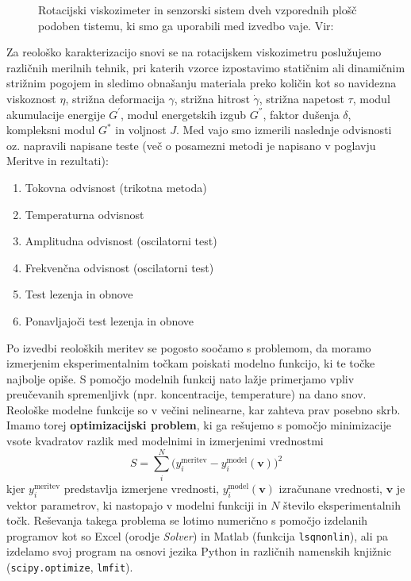 \documentclass{article}
\begin{document}
\begin{figure}
   \caption{Rotacijski viskozimeter in senzorski sistem dveh vzporednih plošč podoben tistemu, ki smo ga uporabili med izvedbo vaje. Vir: }
   \label{fig:viskozimeter}
\end{figure}

Za reološko karakterizacijo snovi se na rotacijskem viskozimetru poslužujemo različnih merilnih tehnik, pri katerih vzorce izpostavimo statičnim ali dinamičnim strižnim pogojem in sledimo obnašanju materiala preko količin kot so navidezna viskoznost $\eta$, strižna deformacija $\gamma$, strižna hitrost $\dot{\gamma}$, strižna napetost $\tau$, modul akumulacije energije $G^{'}$, modul energetskih izgub $G^{''}$, faktor dušenja $\delta$, kompleksni modul $G^*$ in voljnost $J$. Med vajo smo izmerili naslednje odvisnosti oz. napravili napisane teste (več o posamezni metodi je napisano v poglavju Meritve in rezultati):
\begin{enumerate}
\item Tokovna odvisnost (trikotna metoda)
\item Temperaturna odvisnost
\item Amplitudna odvisnost (oscilatorni test)
\item Frekvenčna odvisnost (oscilatorni test)
\item Test lezenja in obnove
\item Ponavljajoči test lezenja in obnove
\end{enumerate}

Po izvedbi reoloških meritev se pogosto soočamo s problemom, da moramo izmerjenim eksperimentalnim točkam poiskati modelno funkcijo, ki te točke najbolje opiše. S pomočjo modelnih funkcij nato lažje primerjamo vpliv preučevanih spremenljivk (npr. koncentracije, temperature) na dano snov. Reološke modelne funkcije so v večini nelinearne, kar zahteva prav posebno skrb. Imamo torej \textbf{optimizacijski problem}, ki ga rešujemo s pomočjo minimizacije vsote kvadratov razlik med modelnimi in izmerjenimi vrednostmi
\begin{equation}
S = \sum\limits^N_i \big(y^\mathrm{meritev}_i-y^\mathrm{model}_i(\mathrm{\textbf{v}})\big)^2
\end{equation}
kjer $y^\mathrm{meritev}_i$ predstavlja izmerjene vrednosti, $y^\mathrm{model}_i(\mathrm{\textbf{v}})$ izračunane vrednosti, $\mathrm{\textbf{v}}$ je vektor parametrov, ki nastopajo v modelni funkciji in $N$ število eksperimentalnih točk. Reševanja takega problema se lotimo numerično s pomočjo izdelanih programov kot so Excel (orodje \textit{Solver}) in Matlab (funkcija \texttt{lsqnonlin}), ali pa izdelamo svoj program na osnovi jezika Python in različnih namenskih knjižnic (\texttt{scipy.optimize}, \texttt{lmfit}).
\end{document}
